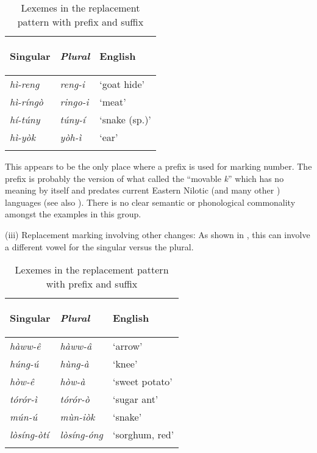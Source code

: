 \documentclass[output=paper]{langsci/langscibook}
\begin{document}
\begin{table}

\begin{tabularx}{.66\textwidth}{>{\itshape}X>{\itshape}XX}
\lsptoprule

 \textup{Singular} & \textup{Plural} & {English}\\ \midrule
 hì-reng &  reng-i & ‘goat hide’\\
 hì-ríngò &  ringo-i & ‘meat’\\
 hí-túny &  túny-í & ‘snake (sp.)’\\
 hì-yòk &  yòh-ì & ‘ear’\\
\lspbottomrule
\end{tabularx}
\caption{Lexemes in the replacement pattern with prefix and suffix}
\label{tab:moodie:15}
\end{table}

This appears to be the only place where a prefix is used for marking number. The prefix is probably the  version of what \citet{Greenberg1981} called the “movable \textit{k}” which has no meaning by itself and predates current Eastern Nilotic (and many other ) languages (see also \citealt[251]{Dimmendaal1983}). There is no clear semantic or phonological commonality amongst the examples in this group.

(iii) Replacement marking involving other changes: As shown in , this can involve a different vowel for the singular versus the plural.

\begin{table}

\begin{tabularx}{.66\textwidth}{>{\itshape}X>{\itshape}XX}
\lsptoprule

 \textup{Singular} & \textup{Plural} & {English}\\ \midrule
 hàww-\^{e} &  hàww-\^{a} & ‘arrow’\\
 húng-ú &  hùng-à & ‘knee’\\
 hòw-\^{e} &  hòw-à & ‘sweet potato’\\
 tórór-ì &  tórór-ò & ‘sugar ant’\\
 mún-ú &  mùn-iòk & ‘snake’\\
 lòsíng-òtí &  lòsíng-óng & ‘sorghum, red’\\
\lspbottomrule
\end{tabularx}
\caption{Lexemes in the replacement pattern with prefix and suffix}
\label{tab:moodie:16}
\end{table}
\end{document}
